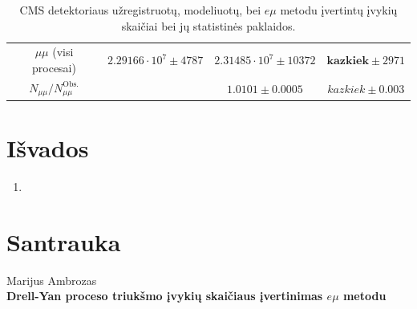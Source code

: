 \documentclass[a4paper, 12pt]{article}
\newcommand{\emu}{e\mu}
\newcommand{\mumu}{\mu\mu}
\begin{document}
\begin{centering}
\begin{table}
\begin{tabular}{|c|c|c|c|}
	\multirow{2}{8em}{\centering $\mumu$ (visi procesai)} &
	\multirow{2}{7em}{\centering $2.29166 \cdot 10^7 \pm 4787$} &
	\multirow{2}{10em}{\centering $2.31485 \cdot 10^7 \pm 10372$}
	&\multirow{2}{10em}{\centering $\mathbf{kazkiek} \pm 2971$} \\
	
 	& & & \\
	\hline
	
	\multirow{2}{8em}{\centering $N_{\mumu}/N_{\mumu}^{\mathrm{Obs.}}$} &
	\multirow{2}{7em}{\centering 1} &
	\multirow{2}{10em}{\centering $1.0101 \pm 0.0005$} &
	\multirow{2}{10em}{\centering $kazkiek \pm 0.003$} \\
	
 	& & & \\
	\hline
\end{tabular}
	\caption{\label{table:finalResults} CMS detektoriaus užregistruotų, modeliuotų, bei $\emu$ metodu įvertintų įvykių skaičiai
	bei jų statistinės paklaidos.}
\end{table}
\end{centering}




\clearpage
\section*{Išvados} 
\begin{enumerate}
\item 
\end{enumerate}

\clearpage
{}



\clearpage
\section*{Santrauka}
\begin{centering}
Marijus Ambrozas\\
\textbf{Drell-Yan proceso triukšmo įvykių skaičiaus įvertinimas $e\mu$ metodu}\\
\end{centering}
\vspace{0.5cm}
\end{document}
